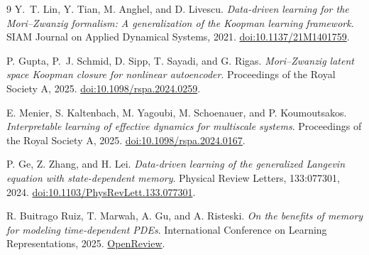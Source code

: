 \documentclass[11pt,a4paper]{article}
\begin{document}
\begin{thebibliography}{9}
Y.~T. Lin, Y. Tian, M. Anghel, and D. Livescu.
\emph{Data-driven learning for the Mori--Zwanzig formalism:
A generalization of the Koopman learning framework}.
SIAM Journal on Applied Dynamical Systems, 2021.
\href{https://doi.org/10.1137/21M1401759}{doi:10.1137/21M1401759}.

P. Gupta, P.~J. Schmid, D. Sipp, T. Sayadi, and G. Rigas.
\emph{Mori--Zwanzig latent space Koopman closure for nonlinear autoencoder}.
Proceedings of the Royal Society A, 2025.
\href{https://doi.org/10.1098/rspa.2024.0259}{doi:10.1098/rspa.2024.0259}.

E. Menier, S. Kaltenbach, M. Yagoubi, M. Schoenauer, and P. Koumoutsakos.
\emph{Interpretable learning of effective dynamics for multiscale systems}.
Proceedings of the Royal Society A, 2025.
\href{https://doi.org/10.1098/rspa.2024.0167}{doi:10.1098/rspa.2024.0167}.

P. Ge, Z. Zhang, and H. Lei.
\emph{Data-driven learning of the generalized Langevin equation with
state-dependent memory}.
Physical Review Letters, 133:077301, 2024.
\href{https://doi.org/10.1103/PhysRevLett.133.077301}{doi:10.1103/PhysRevLett.133.077301}.

R. Buitrago Ruiz, T. Marwah, A. Gu, and A. Risteski.
\emph{On the benefits of memory for modeling time-dependent PDEs}.
International Conference on Learning Representations, 2025.
\href{https://openreview.net/forum?id=o9kqa5K3tB}{OpenReview}.
\end{thebibliography}
\end{document}
